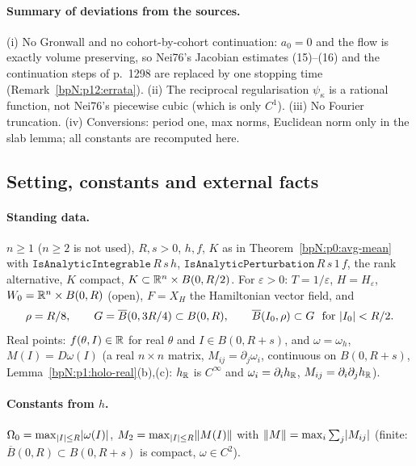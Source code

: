 \paragraph{Summary of deviations from the sources.} (i) No Gronwall and no cohort-by-cohort continuation: $a_0=0$ and the flow is exactly volume preserving, so Nei76's Jacobian estimates (15)--(16) and the continuation steps of p.~1298 are replaced by one stopping time (Remark~\ref{bpN:p12:errata}). (ii) The reciprocal regularisation $\psi_\kappa$ is a rational function, not Nei76's piecewise cubic (which is only $C^1$). (iii) No Fourier truncation. (iv) Conversions: period one, max norms, Euclidean norm only in the slab lemma; all constants are recomputed here.

\subsection{Setting, constants and external facts}\label{bpN:p12:s-setting}

\paragraph{Standing data.} $n\ge1$ ($n\ge2$ is not used), $R,s>0$, $h,f$, $K$ as in Theorem~\ref{bpN:p0:avg-mean} with
$\texttt{IsAnalyticIntegrable}\,R\,s\,h$, $\texttt{IsAnalyticPerturbation}\,R\,s\,1\,f$, the rank alternative, $K$ compact, $K\subset\mathbb{R}^n\times B(0,R/2)$. For $\varepsilon>0$: $T=1/\varepsilon$, $H=H_\varepsilon$,
$W_0=\mathbb{R}^n\times B(0,R)$ (open), $F=X_H$ the Hamiltonian vector field, and
\[\rho=R/8,\qquad G=\overline B(0,3R/4)\subset B(0,R),\qquad \overline B(I_0,\rho)\subset G\ \text{ for }\lvert I_0\rvert<R/2 .\]
Real points: $f(\theta,I)\in\mathbb{R}$ for real $\theta$ and $I\in B(0,R+s)$, and $\omega=\omega_h$, $M(I)=D\omega(I)$ (a real $n\times n$ matrix, $M_{ij}=\partial_j\omega_i$, continuous on $B(0,R+s)$, Lemma~\ref{bpN:p1:holo-real}(b),(c): $h_{\mathbb{R}}$ is $C^\infty$ and $\omega_i=\partial_ih_{\mathbb{R}}$, $M_{ij}=\partial_i\partial_jh_{\mathbb{R}}$).

\paragraph{Constants from $h$.} $\Omega_0=\max_{\lvert I\rvert\le R}\lvert \omega(I)\rvert$, $M_2=\max_{\lvert I\rvert\le R}\lVert M(I)\rVert$ with $\lVert M\rVert=\max_i\sum_j\lvert M_{ij}\rvert$ (finite: $\overline B(0,R)\subset B(0,R+s)$ is compact, $\omega\in C^2$).

